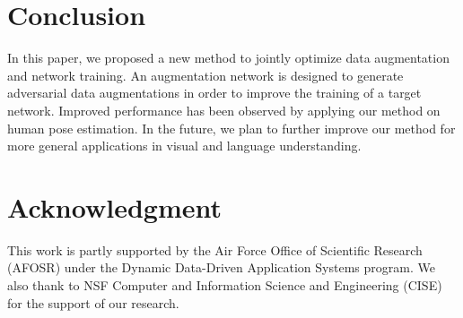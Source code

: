 \documentclass[10pt,twocolumn,letterpaper]{article}
\begin{document}
\begin{table}[htb]
\end{table}%
\vspace{-0.1in}\section{Conclusion}%
In this paper, we proposed a new method to jointly optimize data augmentation and network training. An augmentation network is designed to generate adversarial data augmentations in order to improve the training of a target network. Improved performance has been observed by applying our method on human pose estimation. In the future, we plan to further improve our method for more general applications in visual and language understanding.  


\section{Acknowledgment}
This work is partly supported by the Air Force Office of Scientific Research (AFOSR) under the Dynamic Data-Driven Application Systems program. We also thank to NSF Computer and Information Science and Engineering (CISE) for the support of our research.

{\small


}
\end{document}
